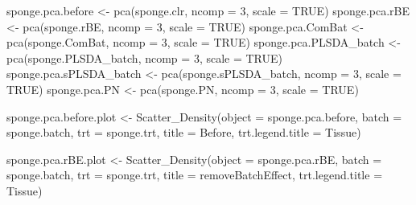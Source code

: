 \documentclass[
]{book}
\newenvironment{Shaded}{\begin{snugshade}}{\end{snugshade}}
\newcommand{\AttributeTok}[1]{\textcolor[rgb]{0.77,0.63,0.00}{#1}}
\newcommand{\ConstantTok}[1]{\textcolor[rgb]{0.00,0.00,0.00}{#1}}
\newcommand{\DecValTok}[1]{\textcolor[rgb]{0.00,0.00,0.81}{#1}}
\newcommand{\FunctionTok}[1]{\textcolor[rgb]{0.00,0.00,0.00}{#1}}
\newcommand{\NormalTok}[1]{#1}
\newcommand{\OtherTok}[1]{\textcolor[rgb]{0.56,0.35,0.01}{#1}}
\newcommand{\StringTok}[1]{\textcolor[rgb]{0.31,0.60,0.02}{#1}}
\begin{document}
\begin{Shaded}
\begin{Highlighting}[]
\NormalTok{sponge.pca.before }\OtherTok{\textless{}{-}} \FunctionTok{pca}\NormalTok{(sponge.clr, }\AttributeTok{ncomp =} \DecValTok{3}\NormalTok{, }
                         \AttributeTok{scale =} \ConstantTok{TRUE}\NormalTok{)}
\NormalTok{sponge.pca.rBE }\OtherTok{\textless{}{-}} \FunctionTok{pca}\NormalTok{(sponge.rBE, }\AttributeTok{ncomp =} \DecValTok{3}\NormalTok{, }
                      \AttributeTok{scale =} \ConstantTok{TRUE}\NormalTok{)}
\NormalTok{sponge.pca.ComBat }\OtherTok{\textless{}{-}} \FunctionTok{pca}\NormalTok{(sponge.ComBat, }\AttributeTok{ncomp =} \DecValTok{3}\NormalTok{, }
                         \AttributeTok{scale =} \ConstantTok{TRUE}\NormalTok{)}
\NormalTok{sponge.pca.PLSDA\_batch }\OtherTok{\textless{}{-}} \FunctionTok{pca}\NormalTok{(sponge.PLSDA\_batch, }\AttributeTok{ncomp =} \DecValTok{3}\NormalTok{, }
                              \AttributeTok{scale =} \ConstantTok{TRUE}\NormalTok{)}
\NormalTok{sponge.pca.sPLSDA\_batch }\OtherTok{\textless{}{-}} \FunctionTok{pca}\NormalTok{(sponge.sPLSDA\_batch, }\AttributeTok{ncomp =} \DecValTok{3}\NormalTok{, }
                               \AttributeTok{scale =} \ConstantTok{TRUE}\NormalTok{)}
\NormalTok{sponge.pca.PN }\OtherTok{\textless{}{-}} \FunctionTok{pca}\NormalTok{(sponge.PN, }\AttributeTok{ncomp =} \DecValTok{3}\NormalTok{, }
                     \AttributeTok{scale =} \ConstantTok{TRUE}\NormalTok{)}
\end{Highlighting}
\end{Shaded}

\begin{Shaded}
\begin{Highlighting}[]
\NormalTok{sponge.pca.before.plot }\OtherTok{\textless{}{-}} 
  \FunctionTok{Scatter\_Density}\NormalTok{(}\AttributeTok{object =}\NormalTok{ sponge.pca.before, }
                  \AttributeTok{batch =}\NormalTok{ sponge.batch, }
                  \AttributeTok{trt =}\NormalTok{ sponge.trt, }
                  \AttributeTok{title =} \StringTok{\textquotesingle{}Before\textquotesingle{}}\NormalTok{, }
                  \AttributeTok{trt.legend.title =} \StringTok{\textquotesingle{}Tissue\textquotesingle{}}\NormalTok{)}
\end{Highlighting}
\end{Shaded}

\begin{Shaded}
\begin{Highlighting}[]
\NormalTok{sponge.pca.rBE.plot }\OtherTok{\textless{}{-}} 
  \FunctionTok{Scatter\_Density}\NormalTok{(}\AttributeTok{object =}\NormalTok{ sponge.pca.rBE, }
                  \AttributeTok{batch =}\NormalTok{ sponge.batch, }
                  \AttributeTok{trt =}\NormalTok{ sponge.trt, }
                  \AttributeTok{title =} \StringTok{\textquotesingle{}removeBatchEffect\textquotesingle{}}\NormalTok{, }
                  \AttributeTok{trt.legend.title =} \StringTok{\textquotesingle{}Tissue\textquotesingle{}}\NormalTok{)}
\end{Highlighting}
\end{Shaded}
\end{document}
